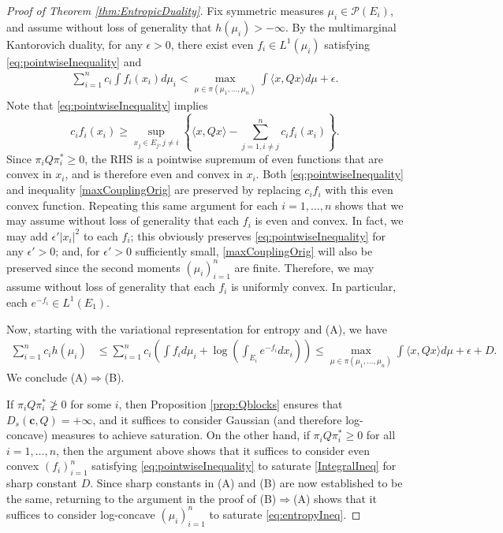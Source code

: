 \documentclass[10pt]{article}
\begin{document}
\begin{proof}[Proof of Theorem \ref{thm:EntropicDuality}]
Fix symmetric measures $\mu_i \in \mathcal{P}(E_i)$, and assume without loss of generality that $h(\mu_i) > -\infty$.   
By the multimarginal Kantorovich duality, for any $\epsilon>0$, there exist even $f_i\in L^1(\mu_i)$ satisfying \eqref{eq:pointwiseInequality} and 
\begin{align}
\sum_{i=1}^n c_i \int f_i(x_i) d\mu_i  <   \max_{\mu \in \pi(\mu_1, \dots, \mu_n)} \int \langle x, Q x\rangle d\mu + \epsilon. \label{maxCouplingOrig}
\end{align}
Note that \eqref{eq:pointwiseInequality} implies
$$
c_i f_i(x_i) \geq \sup_{x_j \in E_j, j\neq i} \left\{ \langle x, Q x \rangle - \sum_{j=1, i\neq j}^n c_i f_i(x_i) \right\}.
$$
Since $\pi_i Q \pi_i^* \geq 0$, the RHS is a pointwise supremum of even functions that are convex in $x_i$, and is therefore  even and convex in $x_i$.  Both \eqref{eq:pointwiseInequality} and  inequality \eqref{maxCouplingOrig} are preserved by replacing $c_i f_i$ with this even convex function.  Repeating this same argument for each $i=1, \dots, n$ shows that we may assume without loss of generality that each $f_i$ is even and convex.  In fact, we may add $\epsilon' |x_i|^2$ to each $f_i$; this obviously preserves \eqref{eq:pointwiseInequality} for any $\epsilon'>0$; and, for $\epsilon'>0$ sufficiently small, \eqref{maxCouplingOrig} will also be preserved since the second moments $(\mu_i)_{i=1}^n$ are finite.  Therefore, we may assume without loss of generality that each $f_i$ is uniformly convex.  In particular, each $e^{-f_i} \in L^1(E_1)$.  



Now, starting with the variational representation for entropy and   (A), we have 
\begin{align*}
\sum_{i=1}^n c_i h(\mu_i)  &\leq \sum_{i=1}^n c_i \left( \int f_i d\mu_i +  \log\left( \int_{E_i} e^{-f_i} dx_i \right)   \right) 
\leq   \max_{\mu \in \pi(\mu_1, \dots, \mu_n)} \int \langle x, Q x\rangle d\mu + \epsilon + D.
\end{align*}
We conclude (A)$\Rightarrow$(B).  


If $\pi_iQ \pi^*_i \not\geq 0$ for some $i$, then Proposition \ref{prop:Qblocks} ensures that $D_s(\mathbf{c},Q)= +\infty$, and it suffices to consider  Gaussian (and therefore log-concave) measures to achieve  saturation.  On the other hand, if $\pi_iQ \pi^*_i  \geq 0$ for all $i=1, \dots, n$, then the argument above shows that it suffices to consider even convex $(f_i)_{i=1}^n$ satisfying \eqref{eq:pointwiseInequality} to saturate \eqref{IntegralIneq} for sharp constant $D$.  Since sharp constants in (A) and (B) are now established to be the same, returning to the argument in the proof of (B)$\Rightarrow$(A) shows that it suffices to consider log-concave $(\mu_i)_{i=1}^n$ to saturate \eqref{eq:entropyIneq}.
\end{proof}
\end{document}
